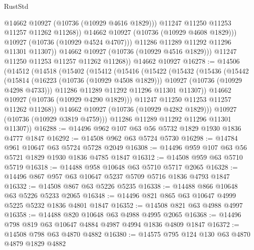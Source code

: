 \begin{lexlean}{RustStd}
\begin{coremodule}
                        @14662
                        @10927
                        (@10736 (@10929 @4616 @1829)))
                      @11247
                      @11250
                      @11253
                      @11257
                      @11262
                      @11268))
                  @14662
                  @10927
                  (@10736 (@10929 @4608 @1829)))
                @10927
                (@10736 (@10929 @4524 @4707)))
              @11286
              @11289
              @11292
              @11296
              @11301
              @11307))
          @14662
          @10927
          (@10736 (@10929 @4516 @1829)))
        @11247
        @11250
        @11253
        @11257
        @11262
        @11268))
    @14662
    @10927
@16278 := @14506
    (@14512
      (@14518
        (@15402
          (@15412
            (@15416
              (@15422
                (@15432
                  (@15436
                    (@15442
                      (@15814
                        (@16223 (@10736 (@10929 @4508 @1829)))
                        @10927
                        (@10736 (@10929 @4298 @4733)))
                      @11286
                      @11289
                      @11292
                      @11296
                      @11301
                      @11307))
                  @14662
                  @10927
                  (@10736 (@10929 @4290 @1829)))
                @11247
                @11250
                @11253
                @11257
                @11262
                @11268))
            @14662
            @10927
            (@10736 (@10929 @4282 @1829)))
          @10927
          (@10736 (@10929 @3819 @4759)))
        @11286
        @11289
        @11292
        @11296
        @11301
        @11307))
@16288 := @14496 @962 @107 @63 @56 @5732 @1829 @1930 @1836 @4777 @1847
@16292 := @14508 @962 @63 @5724 @5730
@16298 := @14784 @961 @10647 @63 @5724 @5728 @2049
@16308 := @14496 @959 @107 @63 @56 @5721 @1829 @1930 @1836 @4785 @1847
@16312 := @14508 @959 @63 @5710 @5719
@16318 := @14488 @958 @10648 @63 @5710 @5717 @2065
@16328 := @14496 @867 @957 @63 @10647 @5237 @5709 @5716 @1836 @4793 @1847
@16332 := @14508 @867 @63 @5226 @5235
@16338 := @14488 @866 @10648 @63 @5226 @5233 @2065
@16348 := @14496 @821 @865 @63 @10647 @4999 @5225 @5232 @1836 @4801 @1847
@16352 := @14508 @821 @63 @4988 @4997
@16358 := @14488 @820 @10648 @63 @4988 @4995 @2065
@16368 := @14496 @798 @819 @63 @10647 @4884 @4987 @4994 @1836 @4809 @1847
@16372 := @14508 @798 @63 @4870 @4882
@16380 := @14575 @795 @124 @130 @63 @4870 @4879 @1829 @4882

\end{coremodule}
\end{lexlean}
